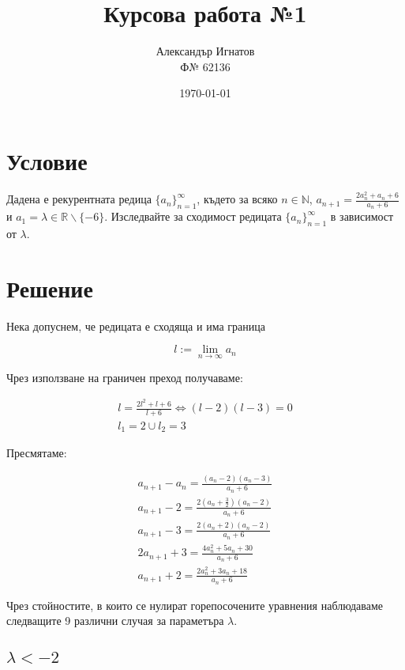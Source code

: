 \documentclass{article}
\title{Курсова работа №1}
\author{Александър Игнатов \\ Ф№ 62136 }
\date{\today}
\begin{document}
\maketitle

\section{Условие}

Дадена е рекурентната редица \( \{a_n\}_{n=1}^\infty \),
където за всяко \( n \in \mathbb{N} \),
\( a_{n+1}=\frac{2a_n^2 + a_n + 6}{a_n + 6} \) и \( a_1 = \lambda \in \mathbb{R} \backslash \{-6\} \).
Изследвайте за сходимост редицата \( \{a_n\}_{n=1}^\infty \) в зависимост от \(\lambda\).

\section{Решение}

Нека допуснем, че редицата е сходяща и има граница

\[
    l := \lim_{n \to \infty} a_n
\]

Чрез използване на граничен преход получаваме:

\begin{gather*}
    l = \frac{2l^2 + l + 6}{l + 6} \Longleftrightarrow (l-2)(l-3) = 0 \\
    l_1 = 2 \cup l_2 = 3
\end{gather*}

Пресмятаме:

\begin{gather}
    a_{n+1} - a_n = \frac{(a_n - 2)(a_n - 3)}{a_n + 6} \\
    a_{n+1} - 2 = \frac{2(a_n + \frac{3}{2})(a_n - 2)}{a_n + 6} \\
    a_{n+1} - 3 = \frac{2(a_n + 2)(a_n - 2)}{a_n + 6} \\
    2a_{n+1} + 3 = \frac{4a_n^2 + 5a_n + 30}{a_n + 6} \\
    a_{n+1} + 2 = \frac{2a_n^2 + 3a_n + 18}{a_n + 6}
\end{gather}

Чрез стойностите, в които се нулират горепосочените уравнения наблюдаваме следващите 9 различни случая за параметъра \( \lambda \).

\subsection{\( \lambda < -2 \)}

\end{document}
